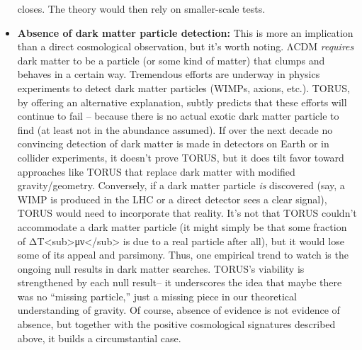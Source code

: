 \begin{itemize}
  closes. The theory would then rely on smaller-scale tests.
\item
  \textbf{Absence of dark matter particle detection:} This is more an
  implication than a direct cosmological observation, but it's worth
  noting. ΛCDM \emph{requires} dark matter to be a particle (or some
  kind of matter) that clumps and behaves in a certain way. Tremendous
  efforts are underway in physics experiments to detect dark matter
  particles (WIMPs, axions, etc.). TORUS, by offering an alternative
  explanation, subtly predicts that these efforts will continue to fail
  -- because there is no actual exotic dark matter particle to find (at
  least not in the abundance assumed). If over the next decade no
  convincing detection of dark matter is made in detectors on Earth or
  in collider experiments, it doesn't prove TORUS, but it does tilt
  favor toward approaches like TORUS that replace dark matter with
  modified gravity/geometry. Conversely, if a dark matter particle
  \emph{is} discovered (say, a WIMP is produced in the LHC or a direct
  detector sees a clear signal), TORUS would need to incorporate that
  reality. It's not that TORUS couldn't accommodate a dark matter
  particle (it might simply be that some fraction of
  ΔT\textless{}sub\textgreater{}μν\textless{}/sub\textgreater{} is due
  to a real particle after all), but it would lose some of its appeal
  and parsimony. Thus, one empirical trend to watch is the ongoing null
  results in dark matter searches. TORUS's viability is strengthened by
  each null result​-- it underscores the idea that maybe there was no
  ``missing particle,'' just a missing piece in our theoretical
  understanding of gravity. Of course, absence of evidence is not
  evidence of absence, but together with the positive cosmological
  signatures described above, it builds a circumstantial case.
\end{itemize}

